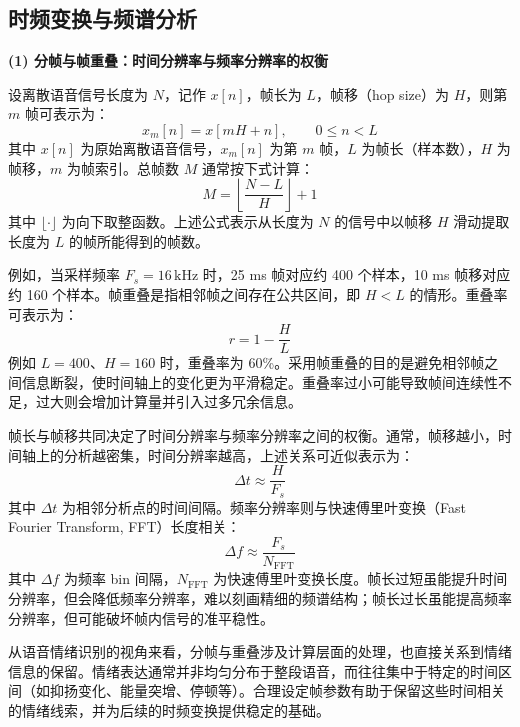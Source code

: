 \subsection{时频变换与频谱分析}

\textbf{(1) 分帧与帧重叠：时间分辨率与频率分辨率的权衡}

设离散语音信号长度为 $N$，记作 $x[n]$，帧长为 $L$，帧移（hop size）为 $H$，则第 $m$ 帧可表示为：
\begin{equation}
x_m[n] = x[mH+n], \qquad 0 \le n < L
\end{equation}
其中 $x[n]$ 为原始离散语音信号，$x_m[n]$ 为第 $m$ 帧，$L$ 为帧长（样本数），$H$ 为帧移，$m$ 为帧索引。总帧数 $M$ 通常按下式计算：
\begin{equation}
M = \left\lfloor \frac{N-L}{H} \right\rfloor + 1
\end{equation}
其中 $\lfloor\cdot\rfloor$ 为向下取整函数。上述公式表示从长度为 $N$ 的信号中以帧移 $H$ 滑动提取长度为 $L$ 的帧所能得到的帧数。

例如，当采样频率 $F_s = 16\,\text{kHz}$ 时，25 ms 帧对应约 400 个样本，10 ms 帧移对应约 160 个样本。帧重叠是指相邻帧之间存在公共区间，即 $H < L$ 的情形。重叠率可表示为：
\begin{equation}
r = 1 - \frac{H}{L}
\end{equation}
例如 $L=400$、$H=160$ 时，重叠率为 60\%。采用帧重叠的目的是避免相邻帧之间信息断裂，使时间轴上的变化更为平滑稳定。重叠率过小可能导致帧间连续性不足，过大则会增加计算量并引入过多冗余信息。

帧长与帧移共同决定了时间分辨率与频率分辨率之间的权衡。通常，帧移越小，时间轴上的分析越密集，时间分辨率越高，上述关系可近似表示为：
\begin{equation}
\Delta t \approx \frac{H}{F_s}
\end{equation}
其中 $\Delta t$ 为相邻分析点的时间间隔。频率分辨率则与快速傅里叶变换（Fast Fourier Transform, FFT）长度相关：
\begin{equation}
\Delta f \approx \frac{F_s}{N_{\mathrm{FFT}}}
\end{equation}
其中 $\Delta f$ 为频率 bin 间隔，$N_{\mathrm{FFT}}$ 为快速傅里叶变换长度。帧长过短虽能提升时间分辨率，但会降低频率分辨率，难以刻画精细的频谱结构；帧长过长虽能提高频率分辨率，但可能破坏帧内信号的准平稳性。

从语音情绪识别的视角来看，分帧与重叠涉及计算层面的处理，也直接关系到情绪信息的保留。情绪表达通常并非均匀分布于整段语音，而往往集中于特定的时间区间（如抑扬变化、能量突增、停顿等）\cite{mirsamadi2017automatic,lin2023chunk,peng2021efficient}。合理设定帧参数有助于保留这些时间相关的情绪线索，并为后续的时频变换提供稳定的基础。

